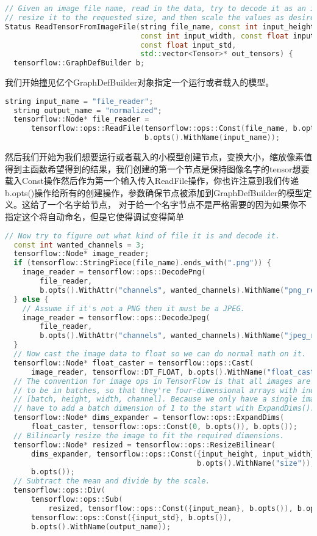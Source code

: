 \begin{lstlisting}[language=C++]
// Given an image file name, read in the data, try to decode it as an image,
// resize it to the requested size, and then scale the values as desired.
Status ReadTensorFromImageFile(string file_name, const int input_height,
                               const int input_width, const float input_mean,
                               const float input_std,
                               std::vector<Tensor>* out_tensors) {
  tensorflow::GraphDefBuilder b;
\end{lstlisting}
我们开始撞见亿个GraphDefBuilder对象指定一个运行或者载入的模型。
\begin{lstlisting}[language=C++]
  string input_name = "file_reader";
  string output_name = "normalized";
  tensorflow::Node* file_reader =
      tensorflow::ops::ReadFile(tensorflow::ops::Const(file_name, b.opts()),
                                b.opts().WithName(input_name));
\end{lstlisting}
然后我们开始为我们想要运行或者载入的小模型创建节点，变换大小，缩放像素值得到主函数希望得到的结果，我们创建的第一个节点是保持图像名字的tensor想要载入Const操作然后作为第一个输入传入ReadFile操作，你也许注意到我们传递b.opts()操作给所有的创建操作，参数确保节点被添加到GraphDefBuilder的模型定义。这给了一个名字给节点，
对于给一个名字节点不是严格需要的因为如果你不指定这个将自动命名，但是它使得调试变得简单
\begin{lstlisting}[language=C++]
  // Now try to figure out what kind of file it is and decode it.
  const int wanted_channels = 3;
  tensorflow::Node* image_reader;
  if (tensorflow::StringPiece(file_name).ends_with(".png")) {
    image_reader = tensorflow::ops::DecodePng(
        file_reader,
        b.opts().WithAttr("channels", wanted_channels).WithName("png_reader"));
  } else {
    // Assume if it's not a PNG then it must be a JPEG.
    image_reader = tensorflow::ops::DecodeJpeg(
        file_reader,
        b.opts().WithAttr("channels", wanted_channels).WithName("jpeg_reader"));
  }
  // Now cast the image data to float so we can do normal math on it.
  tensorflow::Node* float_caster = tensorflow::ops::Cast(
      image_reader, tensorflow::DT_FLOAT, b.opts().WithName("float_caster"));
  // The convention for image ops in TensorFlow is that all images are expected
  // to be in batches, so that they're four-dimensional arrays with indices of
  // [batch, height, width, channel]. Because we only have a single image, we
  // have to add a batch dimension of 1 to the start with ExpandDims().
  tensorflow::Node* dims_expander = tensorflow::ops::ExpandDims(
      float_caster, tensorflow::ops::Const(0, b.opts()), b.opts());
  // Bilinearly resize the image to fit the required dimensions.
  tensorflow::Node* resized = tensorflow::ops::ResizeBilinear(
      dims_expander, tensorflow::ops::Const({input_height, input_width},
                                            b.opts().WithName("size")),
      b.opts());
  // Subtract the mean and divide by the scale.
  tensorflow::ops::Div(
      tensorflow::ops::Sub(
          resized, tensorflow::ops::Const({input_mean}, b.opts()), b.opts()),
      tensorflow::ops::Const({input_std}, b.opts()),
      b.opts().WithName(output_name));
\end{lstlisting}
